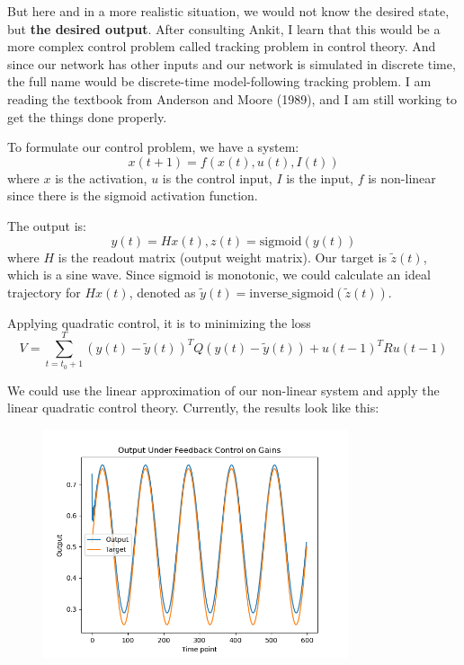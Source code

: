 \documentclass[12pt, a4paper]{article}
\begin{document}
But here and in a more realistic situation, we would not know the desired state, but \textbf{the desired output}. After consulting Ankit, I learn that this would be a more complex control problem called tracking problem in control theory. And since our network has other inputs and our network is simulated in discrete time, the full name would be discrete-time model-following tracking problem. I am reading the textbook from Anderson and Moore (1989), and I am still working to get the things done properly. 

To formulate our control problem, we have a system: 
$$x(t+1) = f(x(t), u(t), I(t))$$
where $x$ is the activation, $u$ is the control input, $I$ is the input, $f$ is non-linear since there is the sigmoid activation function.

The output is:
$$y(t) = Hx(t), z(t) = \text{sigmoid}(y(t))$$
where $H$ is the readout matrix (output weight matrix). Our target is $\tilde{z}(t)$, which is a sine wave. Since sigmoid is monotonic, we could calculate an ideal trajectory for $Hx(t)$, denoted as $\tilde{y}(t) = \text{inverse\_sigmoid}(\tilde{z}(t))$.

Applying quadratic control, it is to minimizing the loss $$V = \sum_{t=t_0+1}^T (y(t) - \tilde{y}(t))^T Q (y(t)- \tilde{y}(t)) + u(t-1)^T R u(t-1)$$

We could use the linear approximation of our non-linear system and apply the linear quadratic control theory. Currently, the results look like this:

\begin{figure}[H]
    \centering
    \includegraphics[width=0.8\textwidth]{RNN/FORCE/fig/FORCE_tracking_output.png} \\
\end{figure}
\end{document}
